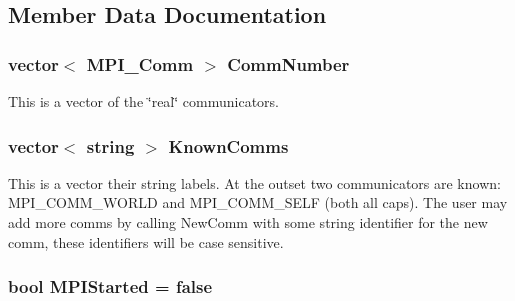 \subsection{Member Data Documentation}
\hypertarget{classJKBuilder_1_1MPIManager_af2e854b00a926ebf1d7c5ecf42b39730}{
\subsubsection[{CommNumber}]{\setlength{\rightskip}{0pt plus 5cm}vector$<$ MPI\_\-Comm $>$ {\bf CommNumber}}}
\label{classJKBuilder_1_1MPIManager_af2e854b00a926ebf1d7c5ecf42b39730}


This is a vector of the \char`\"{}real\char`\"{} communicators. \hypertarget{classJKBuilder_1_1MPIManager_a5c4dab3dd2e63bd6c3095b187a108a79}{
\subsubsection[{KnownComms}]{\setlength{\rightskip}{0pt plus 5cm}vector$<$ string $>$ {\bf KnownComms}}}
\label{classJKBuilder_1_1MPIManager_a5c4dab3dd2e63bd6c3095b187a108a79}


This is a vector their string labels. At the outset two communicators are known: MPI\_\-COMM\_\-WORLD and MPI\_\-COMM\_\-SELF (both all caps). The user may add more comms by calling NewComm with some string identifier for the new comm, these identifiers will be case sensitive. \hypertarget{classJKBuilder_1_1MPIManager_a69d6fedda1d1b6c334d4b158a25c7d6c}{
\subsubsection[{MPIStarted}]{\setlength{\rightskip}{0pt plus 5cm}bool {\bf MPIStarted} = false}}
\label{classJKBuilder_1_1MPIManager_a69d6fedda1d1b6c334d4b158a25c7d6c}


